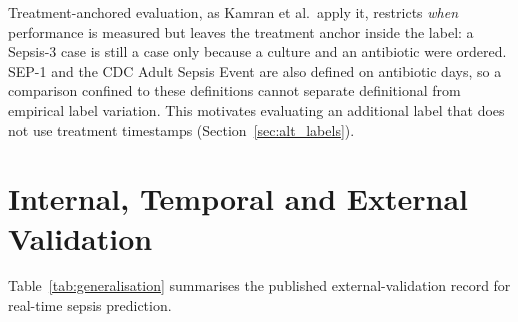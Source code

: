 Treatment-anchored evaluation, as Kamran et al.\ apply it, restricts
\emph{when} performance is measured but leaves the treatment anchor inside the
label: a Sepsis-3 case is still a case only because a culture and an antibiotic
were ordered. SEP-1 and the CDC Adult Sepsis Event are also defined on
antibiotic days, so a comparison confined to these definitions cannot separate
definitional from empirical label variation. This motivates evaluating an
additional label that does not use treatment timestamps
(Section~\ref{sec:alt_labels}).


\section{Internal, Temporal and External Validation}
\label{sec:generalisation}

Table~\ref{tab:generalisation} summarises the published external-validation
record for real-time sepsis prediction.

